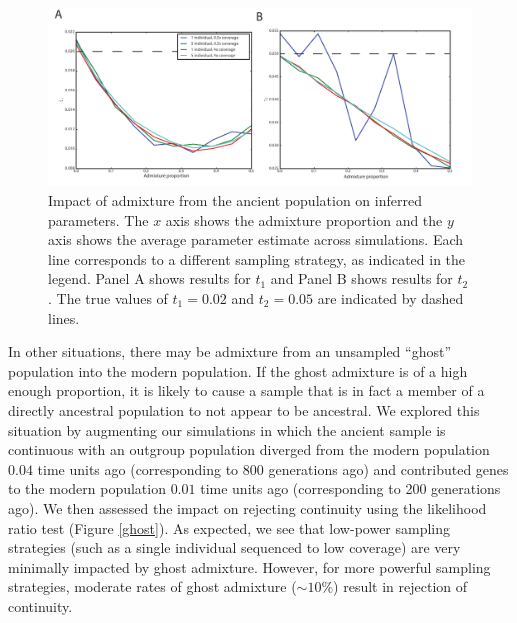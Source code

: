 \documentclass[11pt, oneside]{article}   	%
\begin{document}
\begin{figure}[!h] %
   \centering
   \includegraphics[width=\textwidth]{t1_t2_admixture.pdf} 
   \caption{Impact of admixture from the ancient population on inferred parameters. The $x$ axis shows the admixture proportion and the $y$ axis shows the average parameter estimate across simulations. Each line corresponds to a different sampling strategy, as indicated in the legend. Panel A shows results for $t_1$ and Panel B shows results for $t_2$. The true values of $t_1 = 0.02$ and $t_2 = 0.05$ are indicated by dashed lines.}
   \label{admixture}
\end{figure}

In other situations, there may be admixture from an unsampled ``ghost'' population into the modern population. If the ghost admixture is of a high enough proportion, it is likely to cause a sample that is in fact a member of a directly ancestral population to not appear to be ancestral. We explored this situation by augmenting our simulations in which the ancient sample is continuous with an outgroup population diverged from the modern population $0.04$ time units ago (corresponding to 800 generations ago) and contributed genes to the modern population $0.01$ time units ago (corresponding to 200 generations ago). We then assessed the impact on rejecting continuity using the likelihood ratio test (Figure \ref{ghost}). As expected, we see that low-power sampling strategies (such as a single individual sequenced to low coverage) are very minimally impacted by ghost admixture. However, for more powerful sampling strategies, moderate rates of ghost admixture ($\sim 10\%$) result in rejection of continuity.  
\end{document}

